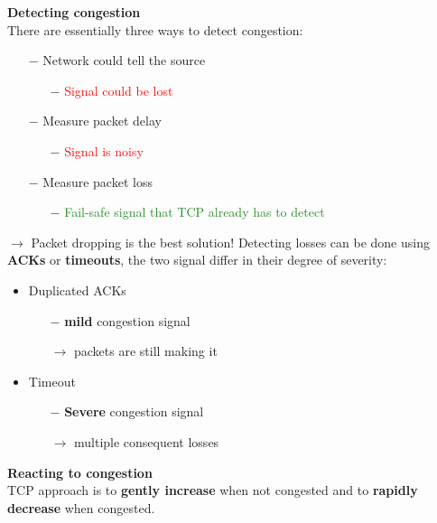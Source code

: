 \documentclass[a4paper, fontsize=8pt, landscape, DIV=1]{scrartcl}
\begin{document}
\begin{multicols*}{4}
		\textbf{Detecting congestion}\\
		There are essentially three ways to detect congestion:
		\begin{itemize}[noitemsep]
			\item[$-$] Network could tell the source
			\begin{itemize}
				\item[$-$] \textcolor{Red}{Signal could be lost}
			\end{itemize}
			\item[$-$] Measure packet delay
			\begin{itemize}
				\item[$-$] \textcolor{Red}{Signal is noisy}
			\end{itemize}
			\item[$-$] Measure packet loss
			\begin{itemize}
				\item[$-$] \textcolor{ForestGreen}{Fail-safe signal that TCP already has to
					detect}
			\end{itemize}
		\end{itemize}
		$\rightarrow$ Packet dropping is the best solution! Detecting losses can be
		done using \textbf{ACKs} or \textbf{timeouts}, the two signal differ in their
		degree of severity:
		\begin{itemize}[noitemsep]
			\item Duplicated ACKs
			\begin{itemize}
				\item[$-$] \textbf{mild} congestion signal
				\item[$\rightarrow$] packets are still making it
			\end{itemize}
			\item Timeout
			\begin{itemize}
				\item[$-$] \textbf{Severe} congestion signal
				\item[$\rightarrow$] multiple consequent losses
			\end{itemize}
		\end{itemize} 
		\par
		
		\textbf{Reacting to congestion}\\
		TCP approach is to \textbf{gently increase} when not congested and to
		\textbf{rapidly decrease} when congested.\par 
		

\end{multicols*}
\end{document}
